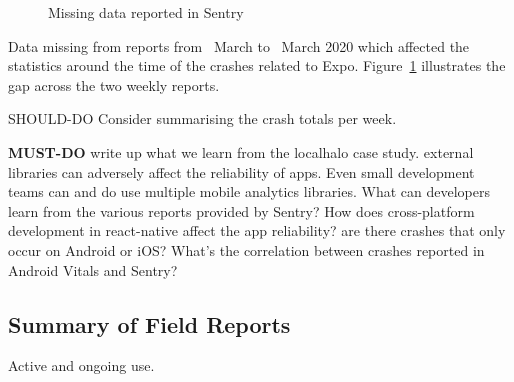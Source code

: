 \begin{figure}[htbp!]
\begin{minipage}{.5\textwidth}
  \label{fig:localhalo-sentry-weekly-report-23-mar-2020}
\end{minipage}
    \caption{Missing data reported in Sentry}
    \label{fig:sentry-missing-data-march-2020}
\end{figure}

Data missing from reports from~ March to~ March 2020 which affected the statistics around the time of the crashes related to Expo. Figure~\ref{fig:sentry-missing-data-march-2020} illustrates the gap across the two weekly reports. 

SHOULD-DO Consider summarising the crash totals per week. 

\textbf{MUST-DO} write up what we learn from the localhalo case study. external libraries can adversely affect the reliability of apps. Even small development teams can and do use multiple mobile analytics libraries. What can developers learn from the various reports provided by Sentry? How does cross-platform development in react-native affect the app reliability? are there crashes that only occur on Android or iOS? What's the correlation between crashes reported in Android Vitals and Sentry?


\subsection{Summary of Field Reports}
Active and ongoing use. 

